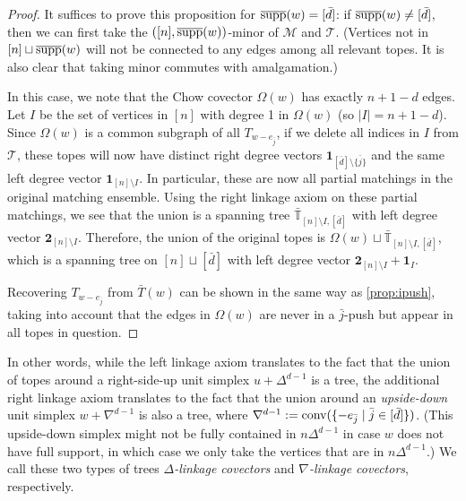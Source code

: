 \documentclass[letterpaper,reqno,11pt]{amsart}
\begin{document}
\begin{proof}
    It suffices to prove this proposition for $\overline{\textnormal{supp}}(w) = [\bar{d}]$: if $\overline{\textnormal{supp}}(w)\neq [\bar{d}]$, then we can first take the $([n], \overline{\textnormal{supp}}(w))$-minor of $\mathcal{M}$ and $\mathcal{T}$. (Vertices not in $[n]\sqcup \overline{\textnormal{supp}}(w)$ will not be connected to any edges among all relevant topes. It is also clear that taking minor commutes with amalgamation.)

    In this case, we note that the Chow covector $\Omega(w)$ has exactly $n+1-d$ edges. Let $I$ be the set of vertices in $[n]$ with degree 1 in $\Omega(w)$ (so $|I| = n+1-d$). Since $\Omega(w)$ is a common subgraph of all $T_{w - e_{\bar{j}}}$, if we delete all indices in $I$ from $\mathcal{T}$, these topes will now have distinct right degree vectors $\mathbf{1}_{[\bar{d}]\setminus \{\bar{j}\}}$ and the same left degree vector $\mathbf{1}_{[n]\setminus I}$. In particular, these are now all partial matchings in the original matching ensemble. Using the right linkage axiom on these partial matchings, we see that the union is a spanning tree $\bar{\mathbb{T}}_{[n]\setminus I, [\bar{d}]}$ with left degree vector $\mathbf{2}_{[n]\setminus I}$. Therefore, the union of the original topes is $\Omega(w)\sqcup \bar{\mathbb{T}}_{[n]\setminus I, [\bar{d}]}$, which is a spanning tree on $[n]\sqcup [\bar{d}]$ with left degree vector $\mathbf{2}_{[n]\setminus I} + \mathbf{1}_I$. 
    
    Recovering $T_{w-e_{\bar{j}}}$ from $\bar{T}(w)$ can be shown in the same way as \cref{prop:ipush}, taking into account that the edges in $\Omega(w)$ are never in a $\bar{j}$-push but appear in all topes in question.
\end{proof}

In other words, while the left linkage axiom translates to the fact that the union of topes around a right-side-up unit simplex $u + \Delta^{d-1}$ is a tree, the additional right linkage axiom translates to the fact that the union around an \emph{upside-down} unit simplex $w + \nabla^{d-1}$ is also a tree, where $\nabla^{d-1}:= \textnormal{conv}(\{-e_{\bar{j}}\mid \bar{j}\in [\bar{d}]\})$. (This upside-down simplex might not be fully contained in $n\Delta^{d-1}$ in case $w$ does not have full support, in which case we only take the vertices that are in $n\Delta^{d-1}$.) We call these two types of trees \emph{$\Delta$-linkage covectors} and \emph{$\nabla$-linkage covectors}, respectively.
\end{document}
